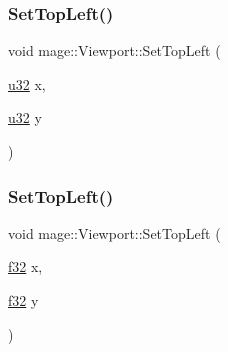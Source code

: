 \hypertarget{structmage_1_1_viewport_ab3874d1da8c9d85623e3a36af58ac6b9}{}\label{structmage_1_1_viewport_ab3874d1da8c9d85623e3a36af58ac6b9} 
\subsubsection{\texorpdfstring{Set\+Top\+Left()}{SetTopLeft()}\hspace{0.1cm}{\footnotesize\ttfamily [1/2]}}
{\footnotesize\ttfamily void mage\+::\+Viewport\+::\+Set\+Top\+Left (\begin{DoxyParamCaption}\item[{\hyperlink{namespacemage_af2b398bf98eb10351f49cad73fe2cc73}{u32}}]{x,  }\item[{\hyperlink{namespacemage_af2b398bf98eb10351f49cad73fe2cc73}{u32}}]{y }\end{DoxyParamCaption})\hspace{0.3cm}{\ttfamily [noexcept]}}

\hypertarget{structmage_1_1_viewport_a1c420f09a0a0df0addaee81ca3a62089}{}\label{structmage_1_1_viewport_a1c420f09a0a0df0addaee81ca3a62089} 
\subsubsection{\texorpdfstring{Set\+Top\+Left()}{SetTopLeft()}\hspace{0.1cm}{\footnotesize\ttfamily [2/2]}}
{\footnotesize\ttfamily void mage\+::\+Viewport\+::\+Set\+Top\+Left (\begin{DoxyParamCaption}\item[{\hyperlink{namespacemage_a6a44ad388483959dc4dff9f2aef91431}{f32}}]{x,  }\item[{\hyperlink{namespacemage_a6a44ad388483959dc4dff9f2aef91431}{f32}}]{y }\end{DoxyParamCaption})\hspace{0.3cm}{\ttfamily [noexcept]}}

\hypertarget{structmage_1_1_viewport_a12a0d7b74ce81786e38f08d399acafc6}{}\label{structmage_1_1_viewport_a12a0d7b74ce81786e38f08d399acafc6} 
